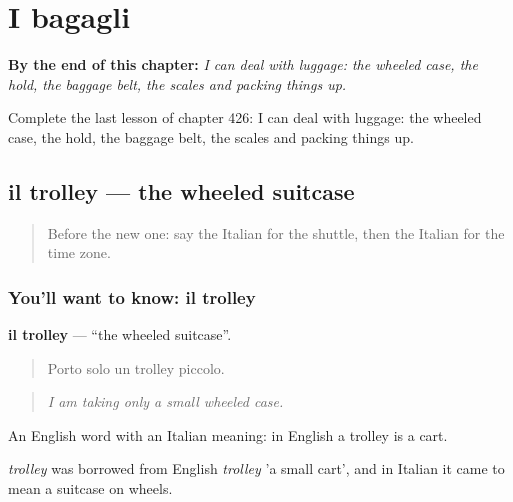 
\chapter{I bagagli}
\label{ch:it-i-bagagli}

\begin{chapteropening}
\textbf{By the end of this chapter:} \emph{I can deal with luggage: the wheeled case, the hold, the baggage belt, the scales and packing things up.}

Complete the last lesson of chapter 426: I can deal with luggage: the wheeled case, the hold, the baggage belt, the scales and packing things up.
\end{chapteropening}

\section[il trolley]{il trolley — the wheeled suitcase}

\label{lesson:IT-C426-trolley}



\begin{quote}
Before the new one: say the Italian for the shuttle, then the Italian for the time zone.
\end{quote}

\subsection*{You'll want to know: il trolley}
\textbf{il trolley} — \textquotedblleft{}the wheeled suitcase\textquotedblright{}.

\begin{quote}
Porto solo un trolley piccolo.
\end{quote}

\begin{quote}
\emph{I am taking only a small wheeled case.}
\end{quote}

An English word with an Italian meaning: in English a trolley is a cart.

\begin{cousinweb}
\emph{trolley} was borrowed from English \emph{trolley} 'a small cart', and in Italian it came to mean a suitcase on wheels.
\end{cousinweb}


